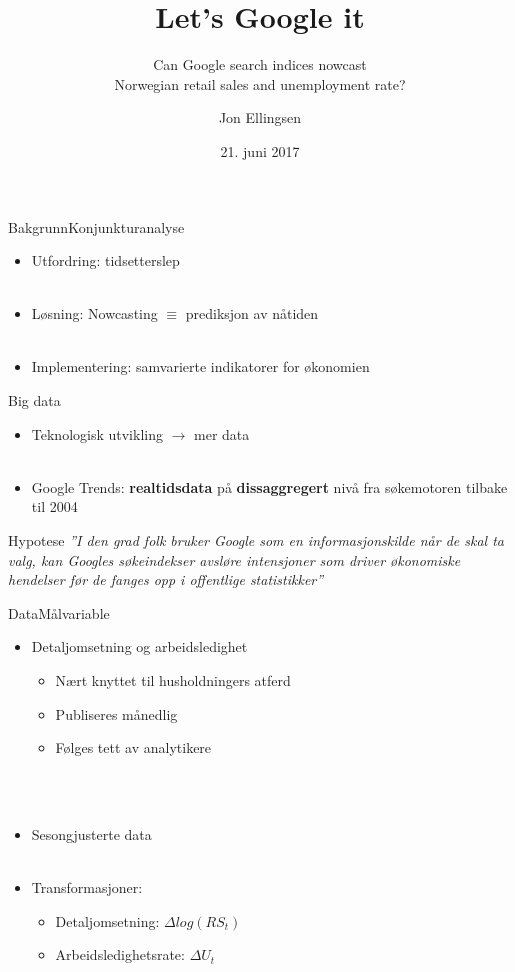 \documentclass{beamer}
\title{Let's Google it}
\subtitle{Can Google search indices nowcast \\
		Norwegian retail sales and unemployment rate?}
\author{Jon Ellingsen}
\institute[]{Masteroppgave \\Universitetet i Oslo \\Økonomisk institutt}
\date{21. juni 2017}
\begin{document}
\begin{frame}
	\titlepage
\end{frame}


\begin{frame}{Bakgrunn}{Konjunkturanalyse}
	\begin{itemize}
		\item Utfordring: tidsetterslep \\~\\
  		\item Løsning: Nowcasting $\equiv$ prediksjon av nåtiden \\~\\
  		\item Implementering: samvarierte indikatorer for økonomien
  	\end{itemize}
\end{frame}


\begin{frame}{Big data}
	\begin{itemize}
		\item Teknologisk utvikling $\rightarrow$ mer data \\~\\
		\item Google Trends: \textbf{realtidsdata} på \textbf{dissaggregert} nivå fra søkemotoren tilbake til 2004
	\end{itemize}
\end{frame}


\begin{frame}{Hypotese}
	\textit{''I den grad folk bruker Google som en informasjonskilde når de skal ta valg, kan Googles søkeindekser avsløre intensjoner som driver økonomiske hendelser før de fanges opp i offentlige statistikker''}
\end{frame}




\begin{frame}{Data}{Målvariable}
  	\begin{itemize}
  		\item Detaljomsetning og arbeidsledighet
  			\begin{itemize}
  				\item Nært knyttet til husholdningers atferd
  				\item Publiseres månedlig
  				\item Følges tett av analytikere
  			\end{itemize} \ \\~\\
		\item Sesongjusterte data \\~\\
		\item Transformasjoner:
			\begin{itemize}
  				\item Detaljomsetning: $\Delta log(RS_t)$
  				\item Arbeidsledighetsrate: $\Delta U_t$
  			\end{itemize}
  	\end{itemize}
\end{frame}
\end{document}
